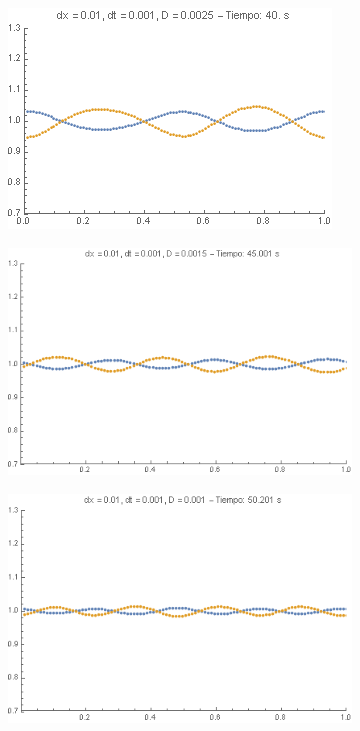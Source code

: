 \documentclass[aps,prb,twocolumn,superscriptaddress,floatfix,longbibliography]{revtex4-2}
\begin{document}
\begin{figure}[h]
     \centering
     \begin{subfigure}[b]{0.3\textwidth}
         \centering
         \includegraphics[width=\textwidth]{D_0.0025.png}
         \caption{\label{fig:D_0.0025}}
     \end{subfigure}
     \hfill
     \begin{subfigure}[b]{0.3\textwidth}
         \centering
         \includegraphics[width=\textwidth]{D_0.0015.png}
         \caption{\label{fig:D_0.0015}}
     \end{subfigure}
     \hfill
          \begin{subfigure}[b]{0.3\textwidth}
         \centering
         \includegraphics[width=\textwidth]{D_0.001.png}

\end{subfigure}
\end{figure}
\end{document}
